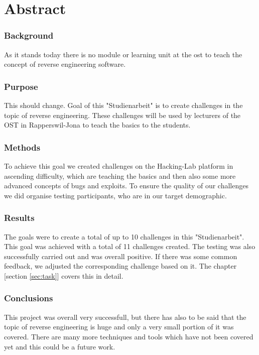 \chapter{Abstract}
\subsection{Background}
As it stands today there is no module or learning unit at the ost to teach the concept of reverse engineering software. 

\subsection{Purpose}
This should change. Goal of this "Studienarbeit" is to create challenges in the topic of reverse engineering. These challenges will be used by lecturers of the OST in Rapperswil-Jona to teach the basics to the students.

\subsection{Methods}
To achieve this goal we created challenges on the Hacking-Lab platform in ascending difficulty, which are teaching the basics and then also some more advanced concepts of bugs and exploits. To ensure the quality of our challenges we did organise testing participants, who are in our target demographic.

\subsection{Results}
The goals were to create a total of up to 10 challenges in this "Studienarbeit". This goal was achieved with a total of 11 challenges created. The testing was also successfully carried out and was overall positive. If there was some common feedback, we adjusted the corresponding challenge based on it. The chapter [section \ref{sec:task}] covers this in detail.

\subsection{Conclusions}
This project was overall very successfull, but there has also to be said that the topic of reverse engineering is huge and only a very small portion of it was covered. There are many more techniques and tools which have not been covered yet and this could be a future work.

